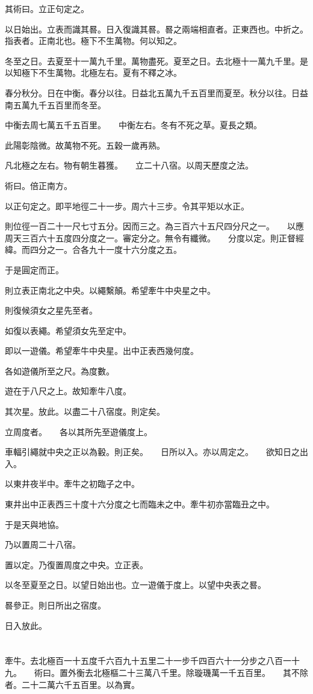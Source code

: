 \documentclass[a4paper,12pt,UTF8,twoside]{ctexbook}
\begin{document}
其術曰。立正句定之。

以日始出。立表而識其晷。日入復識其晷。晷之兩端相直者。正東西也。中折之。指表者。正南北也。極下不生萬物。何以知之。

冬至之日。去夏至十一萬九千里。萬物盡死。夏至之日。去北極十一萬九千里。是以知極下不生萬物。北極左右。夏有不釋之冰。

春分秋分。日在中衡。春分以往。日益北五萬九千五百里而夏至。秋分以往。日益南五萬九千五百里而冬至。

中衡去周七萬五千五百里。　　中衡左右。冬有不死之草。夏長之類。

此陽彰陰微。故萬物不死。五穀一歲再熟。

凡北極之左右。物有朝生暮獲。　　立二十八宿。以周天歷度之法。

術曰。倍正南方。

以正句定之。即平地徑二十一步。周六十三步。令其平矩以水正。

則位徑一百二十一尺七寸五分。因而三之。為三百六十五尺四分尺之一。　　以應周天三百六十五度四分度之一。審定分之。無令有纖微。　　分度以定。則正督經緯。而四分之一。合各九十一度十六分度之五。

于是圓定而正。

則立表正南北之中央。以繩繫顛。希望牽牛中央星之中。

則復候須女之星先至者。

如復以表繩。希望須女先至定中。

即以一遊儀。希望牽牛中央星。出中正表西幾何度。

各如遊儀所至之尺。為度數。

遊在于八尺之上。故知牽牛八度。

其次星。放此。以盡二十八宿度。則定矣。

立周度者。　　各以其所先至遊儀度上。

車輻引繩就中央之正以為轂。則正矣。　　日所以入。亦以周定之。　　欲知日之出入。

以東井夜半中。牽牛之初臨子之中。

東井出中正表西三十度十六分度之七而臨未之中。牽牛初亦當臨丑之中。

于是天與地協。

乃以置周二十八宿。

置以定。乃復置周度之中央。立正表。

以冬至夏至之日。以望日始出也。立一遊儀于度上。以望中央表之晷。

晷參正。則日所出之宿度。

日入放此。

\chapter{}
牽牛。去北極百一十五度千六百九十五里二十一步千四百六十一分步之八百一十九。　　術曰。置外衡去北極樞二十三萬八千里。除璇璣萬一千五百里。　　其不除者。二十二萬六千五百里。以為實。
\end{document}
